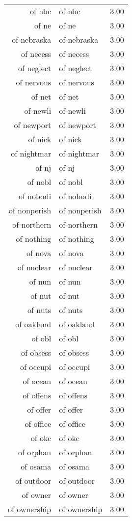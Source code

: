 \begin{table}[ht]
\begin{tabular}{rlr}
  of nbc & of nbc & 3.00 \\ 
  of ne & of ne & 3.00 \\ 
  of nebraska & of nebraska & 3.00 \\ 
  of necess & of necess & 3.00 \\ 
  of neglect & of neglect & 3.00 \\ 
  of nervous & of nervous & 3.00 \\ 
  of net & of net & 3.00 \\ 
  of newli & of newli & 3.00 \\ 
  of newport & of newport & 3.00 \\ 
  of nick & of nick & 3.00 \\ 
  of nightmar & of nightmar & 3.00 \\ 
  of nj & of nj & 3.00 \\ 
  of nobl & of nobl & 3.00 \\ 
  of nobodi & of nobodi & 3.00 \\ 
  of nonperish & of nonperish & 3.00 \\ 
  of northern & of northern & 3.00 \\ 
  of nothing & of nothing & 3.00 \\ 
  of nova & of nova & 3.00 \\ 
  of nuclear & of nuclear & 3.00 \\ 
  of nun & of nun & 3.00 \\ 
  of nut & of nut & 3.00 \\ 
  of nuts & of nuts & 3.00 \\ 
  of oakland & of oakland & 3.00 \\ 
  of obl & of obl & 3.00 \\ 
  of obsess & of obsess & 3.00 \\ 
  of occupi & of occupi & 3.00 \\ 
  of ocean & of ocean & 3.00 \\ 
  of offens & of offens & 3.00 \\ 
  of offer & of offer & 3.00 \\ 
  of office & of office & 3.00 \\ 
  of okc & of okc & 3.00 \\ 
  of orphan & of orphan & 3.00 \\ 
  of osama & of osama & 3.00 \\ 
  of outdoor & of outdoor & 3.00 \\ 
  of owner & of owner & 3.00 \\ 
  of ownership & of ownership & 3.00 \\ 

\end{tabular}
\end{table}
